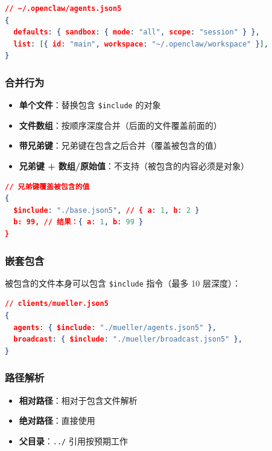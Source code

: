 \begin{lstlisting}[language=json]
// ~/.openclaw/agents.json5
{
  defaults: { sandbox: { mode: "all", scope: "session" } },
  list: [{ id: "main", workspace: "~/.openclaw/workspace" }],
}
\end{lstlisting}


\subsubsection{合并行为}


\begin{itemize}
  \item \textbf{单个文件}：替换包含 \texttt{\$include} 的对象
  \item \textbf{文件数组}：按顺序深度合并（后面的文件覆盖前面的）
  \item \textbf{带兄弟键}：兄弟键在包含之后合并（覆盖被包含的值）
  \item \textbf{兄弟键 + 数组/原始值}：不支持（被包含的内容必须是对象）
\end{itemize}


\begin{lstlisting}[language=json]
// 兄弟键覆盖被包含的值
{
  $include: "./base.json5", // { a: 1, b: 2 }
  b: 99, // 结果：{ a: 1, b: 99 }
}
\end{lstlisting}


\subsubsection{嵌套包含}


被包含的文件本身可以包含 \texttt{\$include} 指令（最多 10 层深度）：

\begin{lstlisting}[language=json]
// clients/mueller.json5
{
  agents: { $include: "./mueller/agents.json5" },
  broadcast: { $include: "./mueller/broadcast.json5" },
}
\end{lstlisting}


\subsubsection{路径解析}


\begin{itemize}
  \item \textbf{相对路径}：相对于包含文件解析
  \item \textbf{绝对路径}：直接使用
  \item \textbf{父目录}：\texttt{../} 引用按预期工作
\end{itemize}


